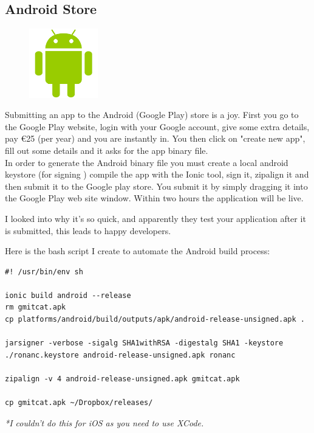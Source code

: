 \subsection{Android Store}
\begin{figure}
	\includegraphics[width=3cm]{img/mobile-app/logos/android.png}
\end{figure} 
Submitting an app to the Android \cite{android} (Google Play) store is a joy.
First you go to the Google Play website, login with your Google account, give some extra details, pay €25 (per year) and you are instantly in.
You then click on "create new app", fill out some details and it asks for the app binary file.
\\
In order to generate the Android binary file you must create a local android keystore (for signing ) compile the app with the Ionic tool, sign it, zipalign it and then submit it to the Google play store.
You submit it by simply dragging it into the Google Play web site window. Within two hours the application will be live.

I looked into why it's so quick, and apparently they test your application after it is submitted, this leads to happy developers.

Here is the bash script I create to automate the Android build process:
\begin{verbatim}
#! /usr/bin/env sh

ionic build android --release
rm gmitcat.apk
cp platforms/android/build/outputs/apk/android-release-unsigned.apk .

jarsigner -verbose -sigalg SHA1withRSA -digestalg SHA1 -keystore ./ronanc.keystore android-release-unsigned.apk ronanc

zipalign -v 4 android-release-unsigned.apk gmitcat.apk

cp gmitcat.apk ~/Dropbox/releases/
\end{verbatim}
\textit{*I couldn't do this for iOS as you need to use XCode.}

